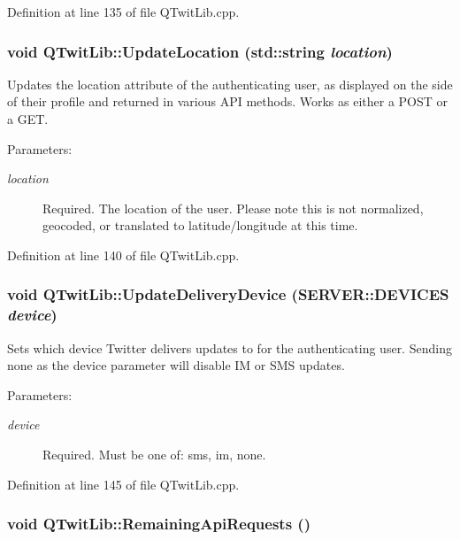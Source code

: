 Definition at line 135 of file QTwitLib.cpp.\hypertarget{classQTwitLib_e5cf26304dbf16a676503ae6c00dae0c}{
\subsubsection{\setlength{\rightskip}{0pt plus 5cm}void QTwitLib::UpdateLocation (std::string {\em location})}}
\label{classQTwitLib_e5cf26304dbf16a676503ae6c00dae0c}


Updates the location attribute of the authenticating user, as displayed on the side of their profile and returned in various API methods. Works as either a POST or a GET. \begin{Desc}
\item[Parameters:]
\begin{description}
\item[{\em location}]Required. The location of the user. Please note this is not normalized, geocoded, or translated to latitude/longitude at this time. \end{description}
\end{Desc}


Definition at line 140 of file QTwitLib.cpp.\hypertarget{classQTwitLib_38f917ae2aacd9c9d6f66ad9d2149f58}{
\subsubsection{\setlength{\rightskip}{0pt plus 5cm}void QTwitLib::UpdateDeliveryDevice ({\bf SERVER::DEVICES} {\em device})}}
\label{classQTwitLib_38f917ae2aacd9c9d6f66ad9d2149f58}


Sets which device Twitter delivers updates to for the authenticating user. Sending none as the device parameter will disable IM or SMS updates. \begin{Desc}
\item[Parameters:]
\begin{description}
\item[{\em device}]Required. Must be one of: sms, im, none. \end{description}
\end{Desc}


Definition at line 145 of file QTwitLib.cpp.\hypertarget{classQTwitLib_5f15bafdef1c85e75895347252c43de4}{
\subsubsection{\setlength{\rightskip}{0pt plus 5cm}void QTwitLib::RemainingApiRequests ()}}
\label{classQTwitLib_5f15bafdef1c85e75895347252c43de4}


